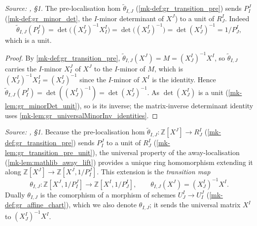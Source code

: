 \begin{lemma}\label{mk-lem:gr_transition_pre_unit}
  \leanok

  \textit{Source: \cite{nitsure-hilbert-quot}, \S 1.}
  The pre-localisation hom \(\tilde\theta_{I,J}\) (\ref{mk-def:gr_transition_pre})
  sends \(P^J_I\) (\ref{mk-def:gr_minor_det}, the \(I\)-minor determinant of
  \(X^J\)) to a unit of \(R^I_J\). Indeed
  \[
    \tilde\theta_{I,J}(P^J_I) = \det\bigl((X^I_J)^{-1} X^I_I\bigr)
      = \det\bigl((X^I_J)^{-1}\bigr) = \det(X^I_J)^{-1} = 1/P^I_J,
  \]
  which is a unit.
\end{lemma}
\begin{proof}
  \leanok
  By \ref{mk-def:gr_transition_pre}, \(\tilde\theta_{I,J}(X^J) = M = (X^I_J)^{-1}
  X^I\), so \(\tilde\theta_{I,J}\) carries the \(I\)-minor \(X^J_I\) of \(X^J\) to
  the \(I\)-minor of \(M\), which is \((X^I_J)^{-1} X^I_I = (X^I_J)^{-1}\) since
  the \(I\)-minor of \(X^I\) is the identity. Hence \(\tilde\theta_{I,J}(P^J_I) =
  \det((X^I_J)^{-1}) = \det(X^I_J)^{-1}\). As \(\det(X^I_J)\) is a unit
  (\ref{mk-lem:gr_minorDet_unit}), so is its inverse; the matrix-inverse
  determinant identity uses \ref{mk-lem:gr_universalMinorInv_identities}.
\end{proof}

\begin{definition}\label{mk-def:gr_transition}
  \leanok

  \textit{Source: \cite{nitsure-hilbert-quot}, \S 1.}
  Because the pre-localisation hom \(\tilde\theta_{I,J} : \mathbb{Z}[X^J] \to
  R^I_J\) (\ref{mk-def:gr_transition_pre}) sends \(P^J_I\) to a unit of \(R^I_J\)
  (\ref{mk-lem:gr_transition_pre_unit}), the universal property of the
  away-localisation (\ref{mk-lem:mathlib_away_lift}) provides a unique ring
  homomorphism extending it along \(\mathbb{Z}[X^J] \to \mathbb{Z}[X^J, 1/P^J_I]\).
  This extension is the \emph{transition map}
  \[
    \theta_{I,J} : \mathbb{Z}[X^J, 1/P^J_I] \longrightarrow
    \mathbb{Z}[X^I, 1/P^I_J], \qquad \theta_{I,J}(X^J) = (X^I_J)^{-1} X^I .
  \]
  Dually \(\theta_{I,J}\) is the comorphism of a morphism of schemes
  \(U^I_J \to U^J_I\) (\ref{mk-def:gr_affine_chart}), which we also denote
  \(\theta_{I,J}\); it sends the universal matrix \(X^I\) to \((X^I_J)^{-1} X^I\).
\end{definition}

